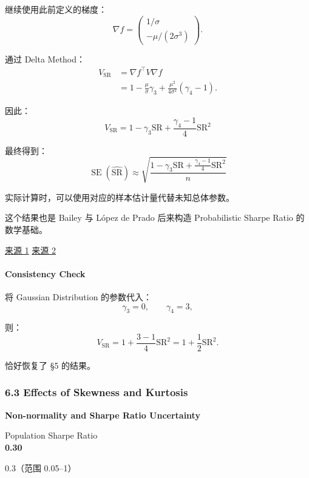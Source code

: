 继续使用此前定义的梯度：
\[\nabla f=
\begin{pmatrix}
1/\sigma\\
-\mu/(2\sigma^3)
\end{pmatrix}.\]

通过 Delta Method：
\[\begin{aligned}
V_{\mathrm{SR}}
&=
\nabla f^\top V\nabla f\\
&=
1-\frac{\mu}{\sigma}\gamma_3
+\frac{\mu^2}{4\sigma^2}(\gamma_4-1).
\end{aligned}\]

因此：
\[\boxed{
V_{\mathrm{SR}}
=
1-\gamma_3\mathrm{SR}
+
\frac{\gamma_4-1}{4}\mathrm{SR}^2
}\]

最终得到：
\[\boxed{
\operatorname{SE}(\widehat{\mathrm{SR}})
\approx
\sqrt{
\frac{
1-\gamma_3\mathrm{SR}
+\frac{\gamma_4-1}{4}\mathrm{SR}^2
}{n}
}
}\]

实际计算时，可以使用对应的样本估计量代替未知总体参数。

这个结果也是 Bailey 与 López de Prado 后来构造 Probabilistic Sharpe Ratio 的数学基础。

\href{https://papers.ssrn.com/sol3/Delivery.cfm/SSRN_ID3594389_code434076.pdf?abstractid=1821643\&type=2}{来源 1} \href{https://ideas.repec.org/a/rsk/journ4/2223785.html}{来源 2}

\hypertarget{part-4-67-0001-consistency-check}{%
\paragraph{Consistency Check}\label{part-4-67-0001-consistency-check}}

将 Gaussian Distribution 的参数代入：
\[\gamma_3=0,\qquad\gamma_4=3,\]

则：
\[V_{\mathrm{SR}}
=
1+\frac{3-1}{4}\mathrm{SR}^2
=
1+\frac12\mathrm{SR}^2.\]

恰好恢复了 §5 的结果。

\hypertarget{part-4-67-0001-effects-of-skewness-and-kurtosis}{%
\subsubsection{6.3 Effects of Skewness and Kurtosis}\label{part-4-67-0001-effects-of-skewness-and-kurtosis}}

\textbf{Non-normality and Sharpe Ratio Uncertainty}

Population Sharpe Ratio\\
\textbf{0.30}

0.3（范围 0.05--1）

